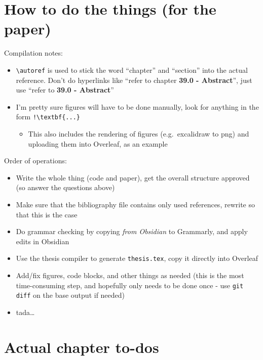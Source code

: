 \section{How to do the things (for the
paper)}\label{how-to-do-the-things-for-the-paper}

Compilation notes:

\begin{itemize}
\tightlist
\item
  \passthrough{\lstinline!\\autoref!} is used to stick the word
  ``chapter'' and ``section'' into the actual reference. Don't do
  hyperlinks like ``refer to chapter \textbf{39.0 - Abstract}'', just
  use ``refer to \textbf{39.0 - Abstract}''
\item
  I'm pretty sure figures will have to be done manually, look for
  anything in the form \passthrough{\lstinline"!\\textbf\{...\}"}

  \begin{itemize}
  \tightlist
  \item
    This also includes the rendering of figures (e.g.~excalidraw to png)
    and uploading them into Overleaf, as an example
  \end{itemize}
\end{itemize}

Order of operations:

\begin{itemize}
\tightlist
\item
  Write the whole thing (code and paper), get the overall structure
  approved (so answer the questions above)
\item
  Make sure that the bibliography file contains only used references,
  rewrite so that this is the case
\item
  Do grammar checking by copying \emph{from Obsidian} to Grammarly, and
  apply edits in Obsidian
\item
  Use the thesis compiler to generate
  \passthrough{\lstinline!thesis.tex!}, copy it directly into Overleaf
\item
  Add/fix figures, code blocks, and other things as needed (this is the
  most time-consuming step, and hopefully only needs to be done once -
  use \passthrough{\lstinline!git diff!} on the base output if needed)
\item
  tada\ldots{}
\end{itemize}

\section{Actual chapter to-dos}\label{actual-chapter-to-dos}


